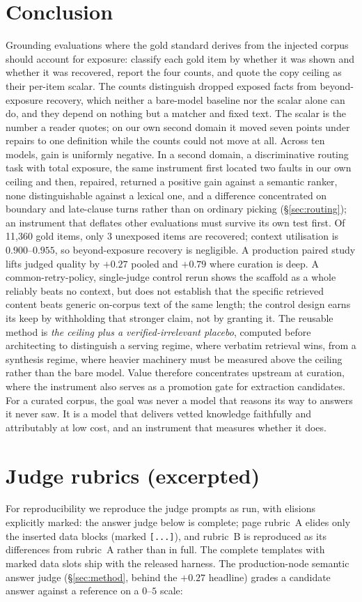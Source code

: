 \documentclass[10pt,twocolumn]{article}
\begin{document}
\section{Conclusion}\label{sec:conclusion}
Grounding evaluations where the gold standard derives from the injected corpus should account for exposure: classify each gold item by whether it was shown and whether it was recovered, report the four counts, and quote the copy ceiling as their per-item scalar. The counts distinguish dropped exposed facts from beyond-exposure recovery, which neither a bare-model baseline nor the scalar alone can do, and they depend on nothing but a matcher and fixed text. The scalar is the number a reader quotes; on our own second domain it moved seven points under repairs to one definition while the counts could not move at all. Across ten models, gain is uniformly negative. In a second domain, a discriminative routing task with total exposure, the same instrument first located two faults in our own ceiling and then, repaired, returned a positive gain against a semantic ranker, none distinguishable against a lexical one, and a difference concentrated on boundary and late-clause turns rather than on ordinary picking (\S\ref{sec:routing}); an instrument that deflates other evaluations must survive its own test first. Of 11{,}360 gold items, only 3 unexposed items are recovered; context utilisation is $0.900$--$0.955$, so beyond-exposure recovery is negligible. A production paired study lifts judged quality by $+0.27$ pooled and $+0.79$ where curation is deep. A common-retry-policy, single-judge control rerun shows the scaffold as a whole reliably beats no context, but does not establish that the specific retrieved content beats generic on-corpus text of the same length; the control design earns its keep by withholding that stronger claim, not by granting it. The reusable method is \emph{the ceiling plus a verified-irrelevant placebo}, computed before architecting to distinguish a serving regime, where verbatim retrieval wins, from a synthesis regime, where heavier machinery must be measured above the ceiling rather than the bare model. Value therefore concentrates upstream at curation, where the instrument also serves as a promotion gate for extraction candidates. For a curated corpus, the goal was never a model that reasons its way to answers it never saw. It is a model that delivers vetted knowledge faithfully and attributably at low cost, and an instrument that measures whether it does.

\appendix
\onecolumn
\section{Judge rubrics (excerpted)}\label{sec:appendix-rubrics}
For reproducibility we reproduce the judge prompts as run, with elisions explicitly
marked: the answer judge below is complete; page rubric~A elides only the inserted
data blocks (marked \texttt{[...]}), and rubric~B is reproduced as its differences
from rubric~A rather than in full. The complete templates with marked data slots
ship with the released harness. The
production-node semantic answer judge (\S\ref{sec:method}, behind the $+0.27$
headline) grades a candidate answer against a reference on a $0$--$5$ scale:
\end{document}
